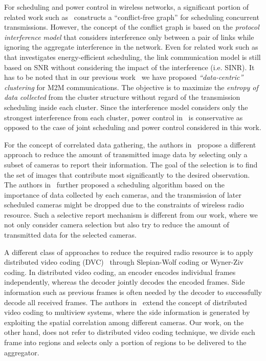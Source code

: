 %
For scheduling and power control in wireless networks, a significant portion of related work such as~\cite{TDMASchedule} constructs a ``conflict-free graph'' for scheduling concurrent transmissions.
However, the concept of the conflict graph is based on the {\em protocol interference model} that considers interference only between a pair of links while ignoring the aggregate interference in the network.
Even for related work such as~\cite{clusterScheduleMinEnergy} that investigates  energy-efficient scheduling, the link communication model is still based on SNR without considering the impact of the interference (i.e. SINR).
%
It has to be noted that in our previous work~\cite{dataCentric} we have proposed {\em ``data-centric'' clustering} for M2M communications.
The objective is to maximize the {\em entropy of data collected} from the cluster structure without regard of the transmission scheduling inside each cluster.
Since the interference model considers only the strongest interference from each cluster, power control in~\cite{dataCentric} is conservative as opposed to the case of joint scheduling and power control considered in this work.

%
For the concept of correlated data gathering, the authors in~\cite{CameraSelection} propose a different approach to reduce the amount of transmitted image data by selecting only a subset of cameras to report their information.
The goal of the selection is to find the set of images that contribute most significantly to the desired observation.
The authors in~\cite{CorrAwareScheduling} further proposed a scheduling algorithm based on the importance of data collected by each cameras, and the transmission of later scheduled cameras might be dropped due to the constraints of wireless radio resource.
Such a selective report mechanism is different from our work, where we not only consider camera selection but also try to reduce the amount of transmitted data for the selected cameras.
%

A different class of approaches to reduce the required radio resource is to apply distributed video coding (DVC)~\cite{DVC} through Slepian-Wolf coding or Wyner-Ziv coding.
In distributed video coding, an encoder encodes individual frames independently, whereas the decoder jointly decodes the encoded frames.
Side information such as previous frames is often needed by the decoder to successfully decode all received frames.
The authors in~\cite{DVCinMVC} extend the concept of distributed video coding to multiview systems, where the side information is generated by exploiting the spatial
correlation among different cameras.
Our work, on the other hand, does not refer to distributed video coding technique, we divide each frame into regions and selects only a portion of regions to be delivered to the aggregator.